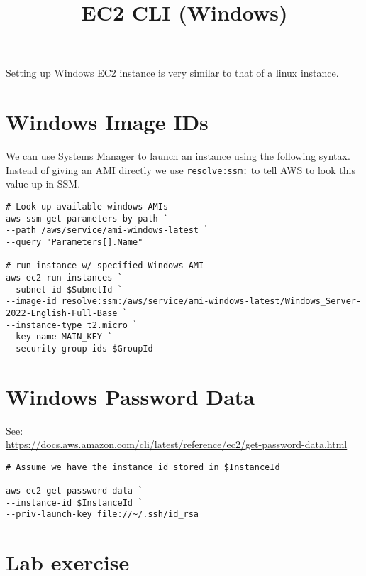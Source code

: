 \documentclass{pgnotes}
\title{EC2 CLI (Windows)}
\begin{document}
\maketitle

Setting up Windows EC2 instance is very similar to that of a linux instance.

\section{Windows Image IDs}

We can use Systems Manager to launch an instance using the following
syntax. Instead of giving an AMI directly we use \texttt{resolve:ssm:}
to tell AWS to look this value up in SSM.

\begin{verbatim}
# Look up available windows AMIs
aws ssm get-parameters-by-path `
--path /aws/service/ami-windows-latest `
--query "Parameters[].Name"

# run instance w/ specified Windows AMI
aws ec2 run-instances `
--subnet-id $SubnetId `
--image-id resolve:ssm:/aws/service/ami-windows-latest/Windows_Server-2022-English-Full-Base `
--instance-type t2.micro `
--key-name MAIN_KEY `
--security-group-ids $GroupId
\end{verbatim}

\section{Windows Password Data}
\label{sec:windows-password-data}

See:\\
\url{https://docs.aws.amazon.com/cli/latest/reference/ec2/get-password-data.html}

\begin{verbatim}
# Assume we have the instance id stored in $InstanceId

aws ec2 get-password-data `
--instance-id $InstanceId `
--priv-launch-key file://~/.ssh/id_rsa
\end{verbatim}

\section{Lab exercise}
\end{document}
